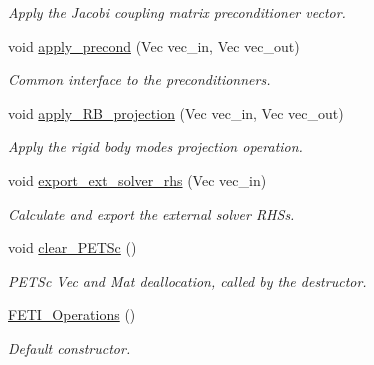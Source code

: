 \begin{DoxyCompactItemize}
\begin{DoxyCompactList}\small\item\em Apply the Jacobi coupling matrix preconditioner vector. \end{DoxyCompactList}\item 
void \hyperlink{classcarl_1_1_f_e_t_i___operations_a90afb4eadbe2b2dcaf997586874a4a17}{apply\+\_\+precond} (Vec vec\+\_\+in, Vec vec\+\_\+out)
\begin{DoxyCompactList}\small\item\em Common interface to the preconditionners. \end{DoxyCompactList}\item 
void \hyperlink{classcarl_1_1_f_e_t_i___operations_a51d2927ec333ba1f3b3587ab5952d19e}{apply\+\_\+\+R\+B\+\_\+projection} (Vec vec\+\_\+in, Vec vec\+\_\+out)
\begin{DoxyCompactList}\small\item\em Apply the rigid body modes projection operation. \end{DoxyCompactList}\item 
void \hyperlink{classcarl_1_1_f_e_t_i___operations_a87c877b4cfd2be4dafe2e55328e4a12a}{export\+\_\+ext\+\_\+solver\+\_\+rhs} (Vec vec\+\_\+in)
\begin{DoxyCompactList}\small\item\em Calculate and export the external solver R\+H\+S\textquotesingle{}s. \end{DoxyCompactList}\item 
void \hyperlink{classcarl_1_1_f_e_t_i___operations_ab8c8aa9c46c0a54d18b09730357f637f}{clear\+\_\+\+P\+E\+T\+Sc} ()
\begin{DoxyCompactList}\small\item\em P\+E\+T\+Sc Vec and Mat deallocation, called by the destructor. \end{DoxyCompactList}\item 
\hyperlink{classcarl_1_1_f_e_t_i___operations_a134becbb3d247ff94e758db07fcf9e18}{F\+E\+T\+I\+\_\+\+Operations} ()
\begin{DoxyCompactList}\small\item\em Default constructor. \end{DoxyCompactList}\end{DoxyCompactItemize}
